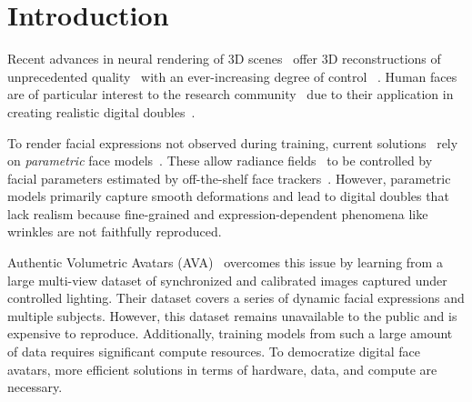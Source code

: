 \section{Introduction}
  \label{sec:blendfields-intro}

  


  Recent advances in neural rendering of 3D scenes~\cite{tewari2022advances}
  offer 3D reconstructions of unprecedented quality~\cite{mildenhall2020nerf}
  with an ever-increasing degree of control ~\cite{kania2022conerf,
  liu2021editing}.
  Human faces are of particular interest to the research
  community~\cite{athar2022rignerf, gafni2021dynamic, garbin2024voltemorph,
  gao2022reconstructing} due to their application in creating realistic
  digital doubles~\cite{ma2021pixel, tewari2022advances, zhang2022avatargen,
  zhi2022dualspace}.

  To render facial expressions not observed during training, current
  solutions~\cite{athar2022rignerf, gafni2021dynamic, garbin2024voltemorph,
  gao2022reconstructing} rely on \textit{parametric} face
  models~\cite{blanz1999morphable}.
  These allow radiance fields~\cite{mildenhall2020nerf} to be controlled by
  facial parameters estimated by off-the-shelf face
  trackers~\cite{li2017flame}.
  However, parametric models primarily capture smooth deformations and lead to
  digital doubles that lack realism because fine-grained and
  expression-dependent phenomena like wrinkles are not faithfully reproduced.

  Authentic Volumetric Avatars (AVA)~\cite{cao2022authentic} overcomes this
  issue by learning from a large multi-view dataset of synchronized and
  calibrated images captured under controlled lighting.
  Their dataset covers a series of dynamic facial expressions and multiple
  subjects.
  However, this dataset remains unavailable to the public and is expensive to
  reproduce.
  Additionally, training models from such a large amount of data requires
  significant compute resources.
  To democratize digital face avatars, more efficient solutions in terms of
  hardware, data, and compute are necessary.

